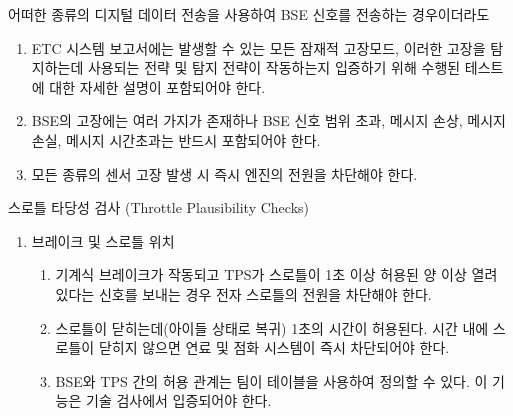 \documentclass[final,a4paper,10pt]{report}
\begin{document}
\begin{enumerate}
\begin{enumerate}
{      \item\label{rule:formula-technical.electronic-throttle-control.bse.digital-fault-handling} 어떠한 종류의 디지털 데이터 전송을 사용하여 BSE 신호를 전송하는 경우이더라도
        \begin{enumerate}
          \item\label{rule:formula-technical.electronic-throttle-control.bse.digital-fault-handling.failure-modes-in-etcsf} ETC 시스템 보고서에는 발생할 수 있는 모든 잠재적 고장모드, 이러한 고장을 탐지하는데 사용되는 전략 및 탐지 전략이 작동하는지 입증하기 위해 수행된 테스트에 대한 자세한 설명이 포함되어야 한다.
          \item\label{rule:formula-technical.electronic-throttle-control.bse.digital-fault-handling.minimum-failure-modes} BSE의 고장에는 여러 가지가 존재하나 BSE 신호 범위 초과, 메시지 손상, 메시지 손실, 메시지 시간초과는 반드시 포함되어야 한다.
          \item\label{rule:formula-technical.electronic-throttle-control.bse.digital-fault-handling.fault-cuts-engine-power} 모든 종류의 센서 고장 발생 시 즉시 엔진의 전원을 차단해야 한다.
        \end{enumerate}
      }
    \end{enumerate}

  \item\label{rule:formula-technical.electronic-throttle-control.plausibility} 스로틀 타당성 검사 (Throttle Plausibility Checks) \label{item:스로틀 타당성 검사}
    \begin{enumerate}
      \item\label{rule:formula-technical.electronic-throttle-control.plausibility.brake-and-throttle} 브레이크 및 스로틀 위치
        \begin{enumerate}
          \item\label{rule:formula-technical.electronic-throttle-control.plausibility.brake-and-throttle.power-off-after-1s} 기계식 브레이크가 작동되고 TPS가 스로틀이 1초 이상 허용된 양 이상 열려 있다는 신호를 보내는 경우 전자 스로틀의 전원을 차단해야 한다.
          \item\label{rule:formula-technical.electronic-throttle-control.plausibility.brake-and-throttle.close-within-1s} {\color{blue} 스로틀이 닫히는데(아이들 상태로 복귀) 1초의 시간이 허용된다.} 시간 내에 스로틀이 닫히지 않으면 연료 및 점화 시스템이 즉시 차단되어야 한다.
          \item\label{rule:formula-technical.electronic-throttle-control.plausibility.brake-and-throttle.lookup-table} BSE와 TPS 간의 허용 관계는 팀이 테이블을 사용하여 정의할 수 있다. 이 기능은 기술 검사에서 입증되어야 한다.
        \end{enumerate}


\end{enumerate}
\end{enumerate}
\end{document}
